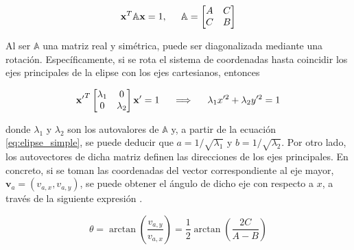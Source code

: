 \begin{equation}
    \mathbf{x}^T \mathbb{A} \mathbf{x} = 1, \hspace{5mm} \mathbb{A} = \begin{bmatrix}
        A & C \\
        C & B
    \end{bmatrix}
    \label{eq:elipse_matriz}
\end{equation}

Al ser $\mathbb{A}$ una matriz real y simétrica, puede ser diagonalizada mediante una rotación.
Específicamente, si se rota el sistema de coordenadas hasta coincidir los ejes principales
de la elipse con los ejes cartesianos, entonces

\begin{equation}
    \mathbf{x'}^T 
    \begin{bmatrix}
        \lambda_1 & 0 \\
        0 & \lambda_2
    \end{bmatrix}
    \mathbf{x'} = 1 \hspace{5mm }\Longrightarrow \hspace{5mm} \lambda_1 x'^2 +  \lambda_2 y'^2 = 1
     \label{eq:elipse_diagonal}
\end{equation}

\noindent donde $\lambda_1$ y $\lambda_2$ son los autovalores de $\mathbb{A}$ y, a partir de la ecuación
\ref{eq:elipse_simple}, se puede deducir que $a = 1/\sqrt{\lambda_1}$ y $b = 1/\sqrt{\lambda_2}$.
Por otro lado, los autovectores de dicha matriz definen las direcciones de los ejes principales.
En concreto, si se toman las coordenadas del vector correspondiente al eje mayor, $\mathbf{v}_a=(v_{a,x},v_{a,y})$,
se puede obtener el ángulo de dicho eje con respecto a $x$, a través de la siguiente expresión \cite{Strang2016}.

\begin{equation}
    \theta = \arctan\left(\frac{v_{a,y}}{v_{a,x}}\right) = \frac{1}{2} \arctan\left(\frac{2C}{A-B}\right)
    \label{eq:angulo_elipse}
\end{equation}


